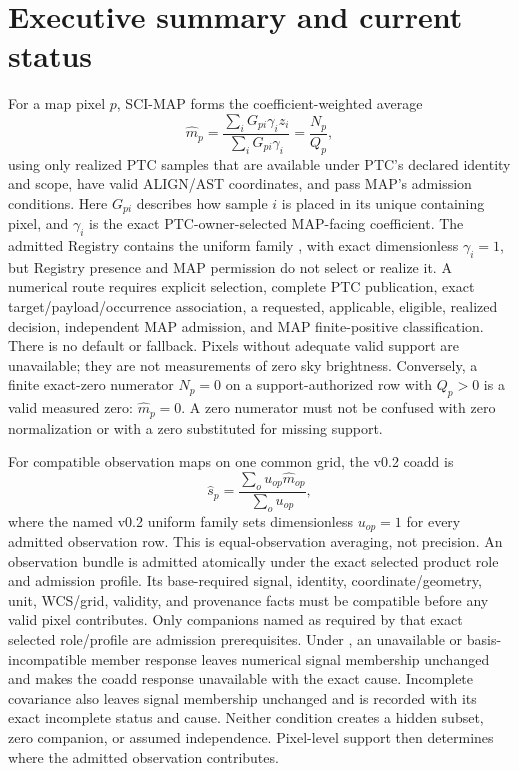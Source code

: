 \documentclass[10pt]{article}
\begin{document}
\section*{Executive summary and current status}
For a map pixel \(p\), SCI-MAP forms the coefficient-weighted average
\begin{equation}
 \widehat m_p=\frac{\sum_iG_{pi}\gamma_i z_i}
                         {\sum_iG_{pi}\gamma_i}
 =\frac{N_p}{Q_p},
 \label{eq:map}
\end{equation}
using only realized PTC samples that are available under PTC's declared
identity and scope, have valid ALIGN/AST coordinates, and pass MAP's admission
conditions. Here \(G_{pi}\) describes how
sample \(i\) is placed in its unique containing pixel, and \(\gamma_i\) is the
exact PTC-owner-selected MAP-facing coefficient. The admitted Registry contains
the uniform family \SCIMapPTCUniformFamily{}, with exact dimensionless
\(\gamma_i=1\), but Registry presence and MAP permission do not select or
realize it. A numerical route requires explicit selection, complete PTC
publication, exact target/payload/occurrence association, a requested,
applicable, eligible, realized \SCIMapPTCUniformHandoffProfile{} decision,
independent MAP admission, and MAP finite-positive classification. There is no
default or fallback. Pixels without adequate valid support are unavailable;
they are not measurements of zero sky brightness. Conversely, a finite
exact-zero numerator \(N_p=0\) on a support-authorized row with \(Q_p>0\)
is a valid measured zero: \(\widehat m_p=0\). A zero numerator must not be
confused with zero normalization or with a zero substituted for missing
support.

For compatible observation maps on one common grid, the v0.2 coadd is
\begin{equation}
 \widehat s_p=\frac{\sum_o u_{op}\widehat m_{op}}
                         {\sum_o u_{op}},
 \label{eq:coadd}
\end{equation}
where the named v0.2 uniform family sets dimensionless \(u_{op}=1\) for every
admitted observation row. This is equal-observation averaging, not precision.
An observation bundle is admitted atomically under the exact selected product
role and admission profile. Its base-required signal, identity,
coordinate/geometry, unit, WCS/grid, validity, and provenance facts must be
compatible before any valid pixel contributes. Only companions named as
required by that exact selected role/profile are admission prerequisites.
Under \SCIMapBaseCoaddRole{}, an unavailable or basis-incompatible member
response leaves numerical signal membership unchanged and makes the coadd
response unavailable with the exact cause. Incomplete covariance also leaves
signal membership unchanged and is recorded with its exact incomplete status
and cause. Neither condition creates a hidden subset, zero companion, or
assumed independence. Pixel-level support then determines where the admitted
observation contributes.
\end{document}
